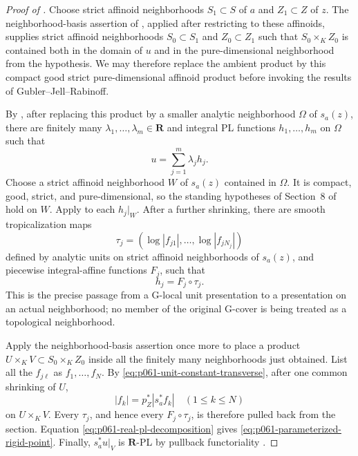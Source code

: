 \begin{proof}[Proof of ]
Choose strict affinoid neighborhoods \(S_1\subset S\) of \(a\) and
\(Z_1\subset Z\) of \(z\).  The neighborhood-basis assertion of
, applied after restricting to these
affinoids, supplies strict affinoid neighborhoods \(S_0\subset S_1\) and
\(Z_0\subset Z_1\) such that \(S_0\times_KZ_0\) is contained both in the
domain of \(u\) and in the pure-dimensional neighborhood from the
hypothesis.  We may therefore replace the ambient product by this
compact good strict pure-dimensional affinoid product before invoking
the results of Gubler--Jell--Rabinoff.

By \cite[Proposition~5.8]{GJR26}, after replacing this product by a
smaller analytic neighborhood \(\Omega\) of \(s_a(z)\), there are
finitely many \(\lambda_1,\ldots,\lambda_m\in\mathbf R\) and integral PL
functions \(h_1,\ldots,h_m\) on \(\Omega\) such that
\begin{equation}
\label{eq:p061-real-pl-decomposition}
                              u=\sum_{j=1}^m\lambda_jh_j.
\end{equation}
Choose a strict affinoid neighborhood \(W\) of \(s_a(z)\) contained in
\(\Omega\).  It is compact, good, strict, and pure-dimensional, so the
standing hypotheses of Section~8 of \cite{GJR26} hold on \(W\).  Apply
\cite[Proposition~8.3]{GJR26} to each \(h_j|_W\).  After a further
shrinking, there are smooth tropicalization maps
\[
 \tau_j=(\log|f_{j1}|,\ldots,\log|f_{jN_j}|)
\]
defined by analytic units on strict affinoid neighborhoods of
\(s_a(z)\), and piecewise integral-affine functions \(F_j\), such that
\[
                              h_j=F_j\circ\tau_j.
\]
This is the precise passage from a G-local unit presentation to a
presentation on an actual neighborhood; no member of the original
G-cover is being treated as a topological neighborhood.

Apply the neighborhood-basis assertion once more to place a product
\(U\times_KV\subset S_0\times_KZ_0\) inside all the finitely many
neighborhoods just obtained.  List all the \(f_{j\ell}\) as
\(f_1,\ldots,f_N\).  By
\eqref{eq:p061-unit-constant-transverse}, after one common shrinking of
\(U\),
\[
                     |f_k|=p_Z^*|s_a^*f_k|
                     \quad(1\leq k\leq N)
\]
on \(U\times_KV\).  Every \(\tau_j\), and hence every
\(F_j\circ\tau_j\), is therefore pulled back from the section.  Equation
\eqref{eq:p061-real-pl-decomposition} gives
\eqref{eq:p061-parameterized-rigid-point}.  Finally,
\(s_a^*u|_V\) is \(\mathbf R\)-PL by pullback functoriality
\cite[Lemma~5.4(1)]{GJR26}.
\end{proof}

